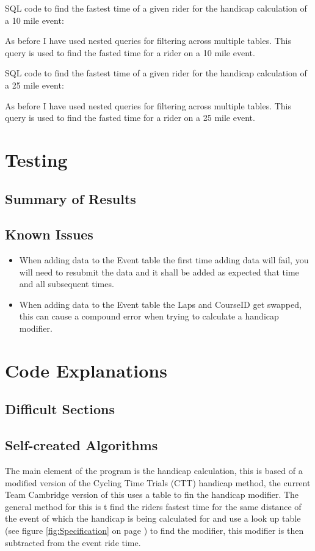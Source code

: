 SQL code to find the fastest time of a given rider for the handicap calculation of a 10 mile event:


As before I have used nested queries for filtering across multiple tables. This query is used to find the fasted time for a rider on a 10 mile event. 

SQL code to find the fastest time of a given rider for the handicap calculation of a 25 mile event:

As before I have used nested queries for filtering across multiple tables. This query is used to find the fasted time for a rider on a 25 mile event. 
\section{Testing}

\subsection{Summary of Results}

\subsection{Known Issues}
\begin{itemize}
\item When adding data to the Event table the first time adding data will fail, you will need to resubmit the data and it shall be added as expected that time and all subsequent times.
\item When adding data to the Event table the Laps and CourseID get swapped, this can cause a compound error when trying to calculate a handicap modifier.
\end{itemize}
\section{Code Explanations}

\subsection{Difficult Sections}

\subsection{Self-created Algorithms}
The main element of the program is the handicap calculation, this is based of a modified version of the Cycling Time Trials (CTT) handicap method, the current Team Cambridge version of this uses a table to fin the handicap modifier. The general method for this is t find the riders fastest time for the same distance of the event of which the handicap is being calculated for and use a look up table (see figure \ref{fig:Specification} on page \pageref{fig:Specification}) to find the modifier, this modifier is then subtracted from the event ride time.


